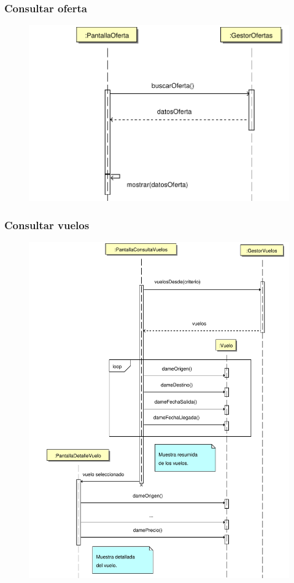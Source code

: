 \documentclass[11pt, a4paper, twoside, titlepage]{article}
\begin{document}
			\subsubsection{Consultar oferta}
				\begin{figure}[H]\centering
					\includegraphics[scale=.7]{diagramas/consultaroferta.pdf}
				\end{figure}

			\subsubsection{Consultar vuelos}
				\begin{figure}[H]\centering
					\includegraphics[scale=.5]{diagramas/consultarvuelos.pdf}
				\end{figure}
\end{document}
